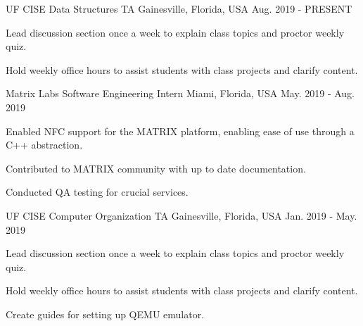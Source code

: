 
\begin{cventries}

  \cventry
    {UF CISE} %
    {Data Structures TA} %
    {Gainesville, Florida, USA} %
    {Aug. 2019 - PRESENT} %
    {
      \begin{cvitems} %
        \item {Lead discussion section once a week to explain class topics and proctor weekly quiz.}
        \item {Hold weekly office hours to assist students with class projects and clarify content.}
      \end{cvitems}
    }


  \cventry
    {Matrix Labs} %
    {Software Engineering Intern} %
    {Miami, Florida, USA} %
    {May. 2019 - Aug. 2019} %
    {
      \begin{cvitems} %
        \item {Enabled NFC support for the MATRIX platform, enabling ease of use through a C++ abstraction.}
        \item {Contributed to MATRIX community with up to date documentation.}
        \item {Conducted QA testing for crucial services.}
      \end{cvitems}
    }


  \cventry
    {UF CISE} %
    {Computer Organization TA} %
    {Gainesville, Florida, USA} %
    {Jan. 2019 - May. 2019} %
    {
      \begin{cvitems} %
        \item {Lead discussion section once a week to explain class topics and proctor weekly quiz.}
        \item {Hold weekly office hours to assist students with class projects and clarify content.}
        \item {Create guides for setting up QEMU emulator.}
      \end{cvitems}
    }


\end{cventries}
